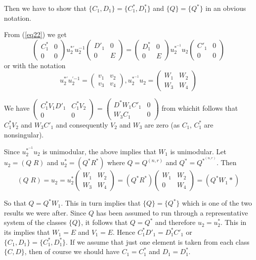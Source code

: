Then we have to show that $\{ C_1, D_1 \} =\{C^*_1, D^*_1 \}$ and $\{Q 
\} = \{ Q^* \}$  in an obvious notation. 

From (\ref{eq22}) we get
$$
\begin{pmatrix}C^*_1 & 0 \\ 0 & 0  \end{pmatrix} u^{*'}_{2}
u^{-1}_2 \begin{pmatrix}D'_1 & 0 \\ 0 & E \end{pmatrix}
= \begin{pmatrix}D^*_1 & 0 \\ 0 & E \end{pmatrix} u^{*^{-1}}_2
u_2 \begin{pmatrix}C'_1 & 0 \\ 0 & 0 \end{pmatrix} 
$$
or with the notation
$$
u^{*'}_2   u^{'{-1}}_2 = \begin{pmatrix}v_1 & v_2 \\ v_3 &
  v_4 \end{pmatrix},   u^{*^{-1}}_2   u_2 = \begin{pmatrix}W_1 & W_2 
  \\ W_3 & W_4 \end{pmatrix} 
$$

We have $\begin{pmatrix}C^*_1 V_1 D'_1 & C^*_1 V_2 \\ 0 &
  0 \end{pmatrix}$ = $\begin{pmatrix}D^* W_1 C'_1 & 0 \\ W_3 C_1 &
  0\end{pmatrix}$ 
from which\pageoriginale it follows that $C^*_1   V_2$ and $W_3   C'_1$  and
consequently $V_2$ and $W_3$ are zero (as $C_1$, $C^*_1$ are
nonsingular). 

Since $u^{*^{-1}}_2   u_2$ is unimodular, the above implies that $W_1$
is unimodular. Let $u_2 = (Q \;  R)$ and $u^*_2 = (Q^*   R^*)$ where $Q
= Q^{(n,r)}$ and $Q^* = Q^{*^{(n,r)}}$. Then 
$$ 
(Q \; R) = u_2 = u^*_2 
\begin{pmatrix}
W_1 & W_2 \\ 
W_3 & W_4 
\end{pmatrix}
= (Q^*   R^*) 
\begin{pmatrix}
W_1 & W_2 \\ 
0 & W_4 
\end{pmatrix} 
= (Q^* W_1   *) 
$$

So that $Q = Q^* W_1$. This in turn implies that $\{Q \} = \{Q^* \}$
which is one of the two results we were after. Since $Q$ has been
assumed to run through a representative system of the classes $\{Q\}$,
it follows that $Q = Q^*$ and therefore $u_2 = u^*_2$. This in its
implies that $W_1 = E$ and $V_1 = E$. Hence $C^*_1   D'_1 = D^*_1
C'_1$ or $\{ C_1, D_1\} = \{ C^*_1, D^*_1 \}$. If we assume that just
one element is taken from each class $\{C , D \}$, then of course we
should have $C_1 = C^*_1$ and $D_1 = D^*_1$. 

